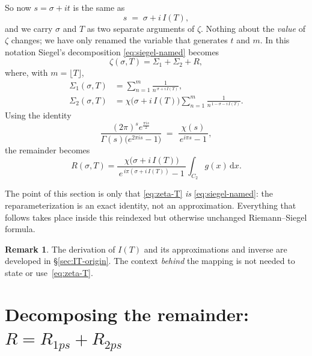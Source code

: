 \documentclass[11pt]{article}
\theoremstyle{definition}
\newtheorem{remark}[theorem]{Remark}
\begin{document}
So now $s=\sigma+it$ is the same as
\begin{equation}
s \;=\; \sigma + i\,I(T),
\end{equation}
and we carry $\sigma$ and $T$ as two separate arguments of $\zeta$. Nothing about
the \emph{value} of $\zeta$ changes; we have only renamed the variable that
generates $t$ and $m$. In this notation Siegel's decomposition
\eqref{eq:siegel-named} becomes
\begin{equation}\label{eq:zeta-T}
\zeta(\sigma,T)
=
\Sigma_{1} + \Sigma_{2} + R,
\end{equation}
where, with $m=\lfloor T\rfloor$,
\begin{align}
\Sigma_{1}(\sigma,T) &= \sum_{n=1}^{m}
\frac{1}{n^{\,\sigma + i\,I(T)}}, \\[4pt]
\Sigma_{2}(\sigma,T) &= \chi\!\bigl(\sigma + i\,I(T)\bigr)
\sum_{n=1}^{m}
\frac{1}{n^{\,1 - \sigma - i\,I(T)}} .
\end{align}
Using the identity
\begin{equation}
\frac{(2\pi)^s e^{\tfrac{\pi i s}{2}}}{\Gamma(s)\bigl(e^{2\pi i s}-1\bigr)}
\;=\;
\frac{\chi(s)}{\,e^{i\pi s}-1\,},
\end{equation}
the remainder becomes
\begin{equation}\label{eq:R-T}
R(\sigma,T)
=
\frac{\chi\!\bigl(\sigma + i\,I(T)\bigr)}{\,e^{\,i\pi (\sigma + i\,I(T))}-1\,}
\int_{C_2} g(x)\,\mathrm{d}x .
\end{equation}

The point of this section is only that \eqref{eq:zeta-T} \emph{is}
\eqref{eq:siegel-named}: the reparameterization is an exact identity, not an
approximation. Everything that follows takes place inside this reindexed but
otherwise unchanged Riemann--Siegel formula.

\begin{remark}
The derivation of $I(T)$ and its approximations and inverse are developed in
\S\ref{sec:IT-origin}. The context \emph{behind} the mapping is not needed to
state or use~\eqref{eq:zeta-T}.
\end{remark}

\section{Decomposing the remainder: \texorpdfstring{$R=R_{1ps}+R_{2ps}$}{R = R1ps + R2ps}}\label{sec:decomp}
\end{document}
